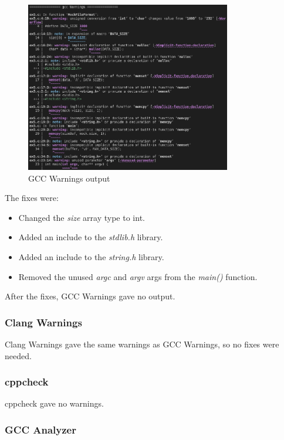 \documentclass{article}
\begin{document}
\begin{figure}[ht!]
    \centering
    \includegraphics[width=0.8\textwidth]{images/ex5/gccWarnings.png}
    \caption{GCC Warnings output}\label{fig:ex5/gccWarnings}
\end{figure}

The fixes were:

\begin{itemize}
    \item Changed the \textit{size} array type to int.
    \item Added an include to the \textit{stdlib.h} library.
    \item Added an include to the \textit{string.h} library.
    \item Removed the unused \textit{argc} and \textit{argv} args from the \textit{main()} function.
\end{itemize}

After the fixes, GCC Warnings gave no output.

\subsubsection{Clang Warnings}

Clang Warnings gave the same warnings as GCC Warnings, so no fixes were needed.

\subsubsection{cppcheck}

cppcheck gave no warnings.

\subsubsection{GCC Analyzer}
\end{document}
